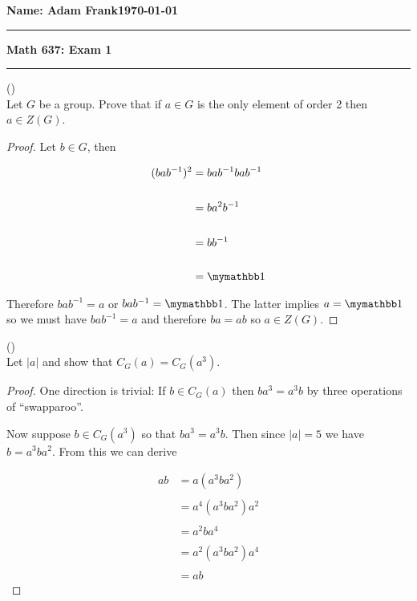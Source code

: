\documentclass{exam}
\begin{document}
\noindent \textbf{Name: Adam Frank}\hfill \textbf{\today}

\vspace{.3cm}
\hrule
\begin{center}
{\bf \Large{Math 637: Exam 1}}
\end{center}
\hrule
\vspace{.3cm}


\begin{questions}
\question()\\
Let $G$ be a group.  Prove that if $a\in G$ is the only element of order 2 then $a\in Z(G)$.

\begin{proof}
  Let $b\in G$, then

\begin{align*}
  (bab^{-1})^2 &= bab^{-1}bab^{-1} \\\\
  &= ba^2b^{-1} \\\\
  &= bb^{-1} \\\\
  &= \mymathbb 1
\end{align*}

Therefore $bab^{-1}=a$ or $bab^{-1}=\mymathbb 1$.  The latter implies $a=\mymathbb 1$ so we must have $bab^{-1}=a$ and therefore $ba=ab$ so $a\in Z(G)$.

\end{proof}

\vspace{1cm}

\question()\\
Let $|a|$ and show that $C_G(a)=C_G(a^3)$.

\begin{proof}
  One direction is trivial:  If $b\in C_G(a)$ then $ba^3 = a^3b$ by three operations of ``swapparoo''.

  Now suppose $b\in C_G(a^3)$ so that $ba^3=a^3b$.  Then since $|a|=5$ we have $b=a^3ba^2$.  From this we can derive

  \begin{align*}
    ab &= a(a^3ba^2)\\\\
    &=a^4(a^3ba^2)a^2 \\\\
    &=a^2ba^4 \\\\
    &= a^2(a^3ba^2)a^4 \\\\
    &= ab
  \end{align*}
\end{proof}


\end{questions}
\end{document}
